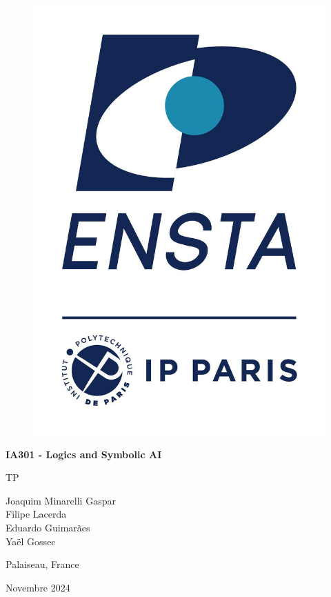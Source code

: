 \documentclass[12pt]{article}
\begin{document}

\begin{titlepage}
 \centering
 \vspace*{1in}
 \begin{figure}[t]
    \centering
    \includegraphics[scale=0.5]{images/Logo_ENSTA_Paris.jpg}
\end{figure}
 \begin{Huge}\bfseries
 IA301 - Logics and Symbolic AI
  
  TP\par
 \end{Huge}
 \vspace{1.5in}
 \begin{large}\bfseries

  
Joaquim Minarelli Gaspar\\
Filipe Lacerda\\
Eduardo Guimarães\\
Yaël Gossec

 \end{large}
 \vfill
	 
 
 \vspace{0.5in}
 Palaiseau, France
 \par
 
 \vspace{0.5in}
 Novembre 2024
 \par
\end{titlepage}
\end{document}
